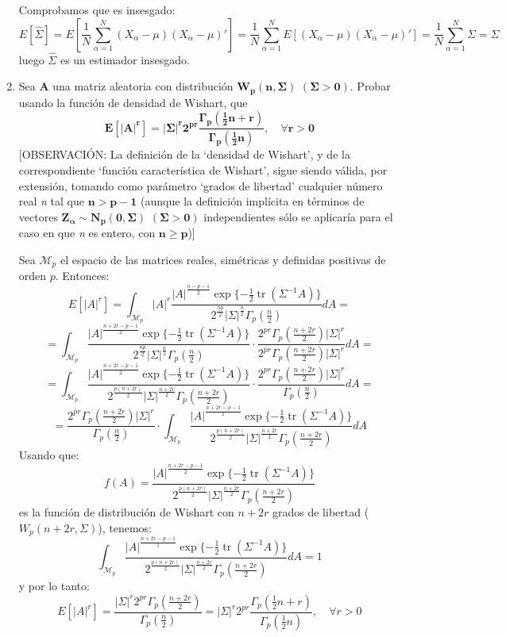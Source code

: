 \documentclass[11pt,a4paper]{article}
\begin{document}
\begin{enumerate}[label=\arabic*.]
Comprobamos que es insesgado:
$$E[\hat{\Sigma}] = E[\frac{1}{N} \sum_{\alpha=1}^{N} (X_{\alpha}-\mu)(X_{\alpha}-\mu)'] = \frac{1}{N} \sum_{\alpha=1}^{N} E[(X_{\alpha}-\mu)(X_{\alpha}-\mu)'] = \frac{1}{N} \sum_{\alpha=1}^{N} \Sigma = \Sigma$$
luego $\hat{\Sigma}$ es un estimador insesgado.

\newpage
\bfseries
\item Sea $\mathbf{A}$ una matriz aleatoria con distribución $\mathbf{W_{p}(n, \Sigma)}$ $\mathbf{(\Sigma > 0)}$. Probar usando la función de densidad de Wishart, que
$$\mathbf{E[|A|^{r}] = |\Sigma|^{r} 2^{pr} \frac{\Gamma_{p}(\frac{1}{2}n+r)}{\Gamma_{p}(\frac{1}{2}n)}, \quad \forall r > 0}$$
[OBSERVACIÓN: La definición de la `densidad de Wishart', y de la correspondiente `función característica de Wishart', sigue siendo válida, por extensión, tomando como parámetro `grados de libertad' cualquier número real \emph{n} tal que $\mathbf{n > p-1}$ (aunque la definición implícita en términos de vectores $\mathbf{Z_{\alpha} \sim N_{p}(0, \Sigma)}$ $\mathbf{(\Sigma > 0)}$ independientes sólo se aplicaría para el caso en que \emph{n} es entero, con $\mathbf{n \geq p}$)]

\vspace{0.5cm}
\normalfont

Sea $\mathcal{M}_{p}$ el espacio de las matrices reales, simétricas y definidas positivas de orden $p$. Entonces:
$$E[|A|^{r}] = \int_{\mathcal{M}_{p}} |A|^{r} \frac{|A|^{\frac{n-p-1}{2}} \exp\{-\frac{1}{2} \operatorname{tr}(\Sigma^{-1}A)\}}{2^{\frac{np}{2}}|\Sigma|^{\frac{n}{2}}\Gamma_{p}(\frac{n}{2})} dA =$$
$$= \int_{\mathcal{M}_{p}} \frac{|A|^{\frac{n+2r-p-1}{2}} \exp\{-\frac{1}{2} \operatorname{tr}(\Sigma^{-1}A)\}}{2^{\frac{np}{2}}|\Sigma|^{\frac{n}{2}}\Gamma_{p}(\frac{n}{2})} \cdot \frac{2^{pr} \Gamma_{p}(\frac{n+2r}{2})|\Sigma|^{r}}{2^{pr}\Gamma_{p}(\frac{n+2r}{2})|\Sigma|^{r}} dA =$$
$$= \int_{\mathcal{M}_{p}} \frac{|A|^{\frac{n+2r-p-1}{2}} \exp\{-\frac{1}{2} \operatorname{tr}(\Sigma^{-1}A)\}}{2^{\frac{p(n+2r)}{2}}|\Sigma|^{\frac{n+2r}{2}}\Gamma_{p}(\frac{n+2r}{2})} \cdot \frac{2^{pr} \Gamma_{p}(\frac{n+2r}{2})|\Sigma|^{r}}{\Gamma_{p}(\frac{n}{2})} dA =$$
$$= \frac{2^{pr}\Gamma_{p}(\frac{n+2r}{2})|\Sigma|^{r}}{\Gamma_{p}(\frac{n}{2})} \cdot \int_{\mathcal{M}_{p}} \frac{|A|^{\frac{n+2r-p-1}{1}} \exp\{-\frac{1}{2} \operatorname{tr}(\Sigma^{-1}A)\}}{2^{\frac{p(n+2r)}{2}} |\Sigma|^{\frac{n+2r}{2}} \Gamma_{p}(\frac{n+2r}{2})} dA$$
Usando que:
$$f(A) = \frac{|A|^{\frac{n+2r-p-1}{2}} \exp\{-\frac{1}{2} \operatorname{tr}(\Sigma^{-1}A)\}}{2^{\frac{p(n+2r)}{2}}|\Sigma|^{\frac{n+2r}{2}}\Gamma_{p}(\frac{n+2r}{2})}$$
es la función de distribución de Wishart con $n+2r$ grados de libertad ($W_{p}(n+2r, \Sigma)$), tenemos:
$$\int_{\mathcal{M}_{p}} \frac{|A|^{\frac{n+2r-p-1}{1}} \exp\{-\frac{1}{2} \operatorname{tr}(\Sigma^{-1}A)\}}{2^{\frac{p(n+2r)}{2}} |\Sigma|^{\frac{n+2r}{2}} \Gamma_{p}(\frac{n+2r}{2})} dA = 1$$
y por lo tanto:
$$E[|A|^{r}] = \frac{|\Sigma|^{r}2^{pr}\Gamma_{p}(\frac{n+2r}{2})}{\Gamma_{p}(\frac{n}{2})} = |\Sigma|^{r} 2^{pr} \frac{\Gamma_{p}(\frac{1}{2}n+r)}{\Gamma_{p}(\frac{1}{2}n)}, \quad \forall r > 0$$


\end{enumerate}
\end{document}
